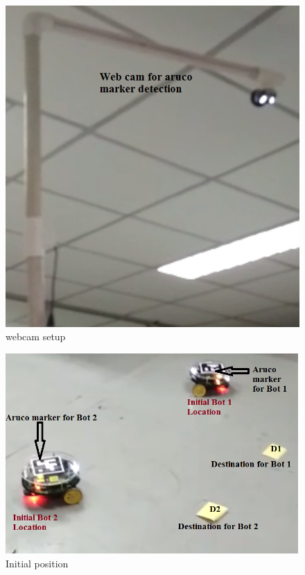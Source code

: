 \documentclass[]{exam}
\begin{document}
  \begin{figure}[h!]
 \centering 
  \includegraphics[scale=0.5]{webcam.png}
  \caption{webcam setup }
  \label{webcam}
  
  
  \end{figure}
  
\begin{figure}[h!]
 \centering 
  \includegraphics[scale=0.5]{init.png}
  \caption{Initial position }
  \label{init}
  \end{figure}
  
\end{document}
